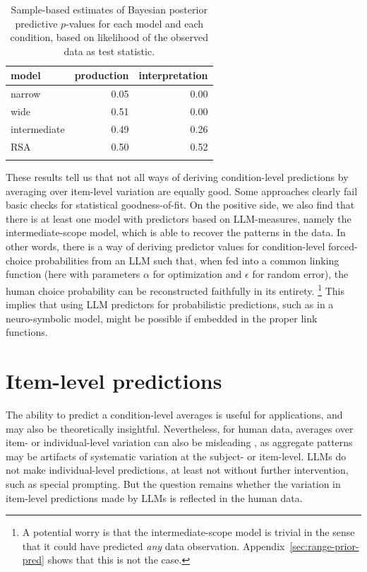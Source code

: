 \documentclass{article}
\begin{document}
\begin{table}[ht]
\centering

\begin{tabular}{lrr}
  \toprule
  model        & production & interpretation \\ \midrule
  narrow       & 0.05       & 0.00 \\
  wide         & 0.51       & 0.00 \\
  intermediate & 0.49       & 0.26 \\
  RSA          & 0.50       & 0.52 \\
  \bottomrule \\
\end{tabular}

\caption{Sample-based estimates of Bayesian posterior predictive $p$-values for each model and each condition, based on likelihood of the observed data as test statistic.}
\label{tab:Bppp-values}
\end{table}

These results tell us that not all ways of deriving condition-level predictions by averaging over item-level variation are equally good.
Some approaches clearly fail basic checks for statistical goodness-of-fit.
On the positive side, we also find that there is at least one model with predictors based on LLM-measures, namely the intermediate-scope model, which is able to recover the patterns in the data.
In other words, there is a way of deriving predictor values for condition-level forced-choice probabilities from an LLM such that, when fed into a common linking function (here with parameters $\alpha$ for optimization and $\epsilon$ for random error), the human choice probability can be reconstructed faithfully in its entirety. \footnote{
  A potential worry is that the intermediate-scope model is trivial in the sense that it could have predicted \emph{any} data observation.
  Appendix~\ref{sec:range-prior-pred} shows that this is not the case.
}
This implies that using LLM predictors for probabilistic predictions, such as in a neuro-symbolic model, might be possible if embedded in the proper link functions.


\section{Item-level predictions}
\label{sec:item-level-pred}

The ability to predict a condition-level averages is useful for applications, and may also be theoretically insightful.
Nevertheless, for human data, averages over item- or individual-level variation can also be misleading \citep[e.g.,][]{StanovichWest2000:Individual-diff,EstesMaddox2005:Risks-of-Drawin,HaafRouder2019:Some-do-and-som}, as aggregate patterns may be artifacts of systematic variation at the subject- or item-level.
LLMs do not make individual-level predictions, at least not without further intervention, such as special prompting.
But the question remains whether the variation in item-level predictions made by LLMs is reflected in the human data.
\end{document}
